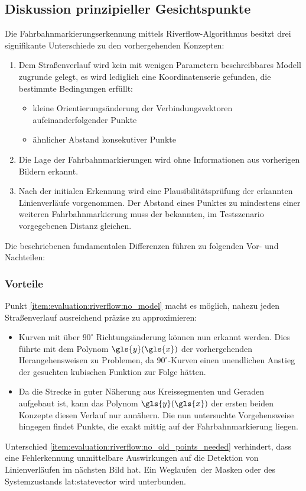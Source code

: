 \subsection{Diskussion prinzipieller Gesichtspunkte} 
Die Fahrbahnmarkierungserkennung mittels Riverflow-Algorithmus besitzt drei signifikante Unterschiede zu den vorhergehenden Konzepten:
\begin{enumerate}
\item \label{item:evaluation:riverflow:no_model}
Dem Straßenverlauf wird kein mit wenigen Parametern beschreibbares Modell zugrunde gelegt, es wird lediglich eine Koordinatenserie gefunden, die bestimmte Bedingungen erfüllt:
\begin{itemize}
\item kleine Orientierungsänderung der Verbindungsvektoren aufeinanderfolgender Punkte
\item ähnlicher Abstand konsekutiver Punkte
\end{itemize}
\item \label{item:evaluation:riverflow:no_old_points_needed}
Die Lage der Fahrbahnmarkierungen wird ohne Informationen aus vorherigen Bildern erkannt.
\item \label{item:evaluation:riverflow:verification}
Nach der initialen Erkennung wird eine Plausibilitätsprüfung der erkannten Linienverläufe vorgenommen. Der Abstand eines Punktes zu mindestens einer weiteren Fahrbahnmarkierung muss der bekannten, im Testszenario vorgegebenen Distanz gleichen. 
\end{enumerate}
Die beschriebenen fundamentalen Differenzen führen zu folgenden Vor- und Nachteilen:

\subsubsection{Vorteile}
Punkt \ref{item:evaluation:riverflow:no_model} macht es möglich, nahezu jeden Straßenverlauf ausreichend präzise zu approximieren:
\begin{itemize} 
\item
Kurven mit über \(90^{\circ}\) Richtungsänderung können nun erkannt werden. Dies führte mit dem Polynom \(\gls{y}(\gls{x})\) der vorhergehenden Herangehensweisen zu Problemen, da \(90^{\circ}\)-Kurven einen unendlichen Anstieg der gesuchten kubischen Funktion zur Folge hätten.
\item
Da die Strecke in guter Näherung aus Kreissegmenten und Geraden aufgebaut ist, kann das  Polynom \(\gls{y}(\gls{x})\) der ersten beiden Konzepte diesen Verlauf nur annähern. Die nun untersuchte Vorgehensweise hingegen findet Punkte, die exakt mittig auf der Fahrbahnmarkierung liegen.
\end{itemize}
Unterschied \ref{item:evaluation:riverflow:no_old_points_needed} verhindert, dass eine Fehlerkennung unmittelbare Auswirkungen auf die Detektion von Linienverläufen im nächsten Bild hat. Ein \glqq Weglaufen\grqq\ der Masken oder des Systemzustands \gls{lat:statevector} wird unterbunden.

